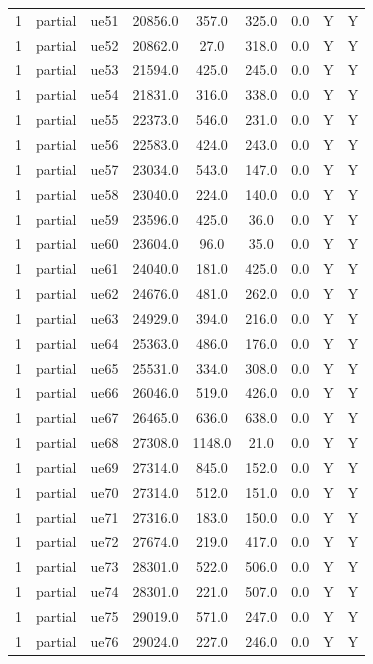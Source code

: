 \begin{table}[ht]
\begin{tabular}{|c|c|c|c|c|c|c|c|c|}
1 & partial & ue51 & 20856.0 & 357.0 & 325.0 & 0.0 & Y & Y \\
1 & partial & ue52 & 20862.0 & 27.0 & 318.0 & 0.0 & Y & Y \\
1 & partial & ue53 & 21594.0 & 425.0 & 245.0 & 0.0 & Y & Y \\
1 & partial & ue54 & 21831.0 & 316.0 & 338.0 & 0.0 & Y & Y \\
1 & partial & ue55 & 22373.0 & 546.0 & 231.0 & 0.0 & Y & Y \\
1 & partial & ue56 & 22583.0 & 424.0 & 243.0 & 0.0 & Y & Y \\
1 & partial & ue57 & 23034.0 & 543.0 & 147.0 & 0.0 & Y & Y \\
1 & partial & ue58 & 23040.0 & 224.0 & 140.0 & 0.0 & Y & Y \\
1 & partial & ue59 & 23596.0 & 425.0 & 36.0 & 0.0 & Y & Y \\
1 & partial & ue60 & 23604.0 & 96.0 & 35.0 & 0.0 & Y & Y \\
1 & partial & ue61 & 24040.0 & 181.0 & 425.0 & 0.0 & Y & Y \\
1 & partial & ue62 & 24676.0 & 481.0 & 262.0 & 0.0 & Y & Y \\
1 & partial & ue63 & 24929.0 & 394.0 & 216.0 & 0.0 & Y & Y \\
1 & partial & ue64 & 25363.0 & 486.0 & 176.0 & 0.0 & Y & Y \\
1 & partial & ue65 & 25531.0 & 334.0 & 308.0 & 0.0 & Y & Y \\
1 & partial & ue66 & 26046.0 & 519.0 & 426.0 & 0.0 & Y & Y \\
1 & partial & ue67 & 26465.0 & 636.0 & 638.0 & 0.0 & Y & Y \\
1 & partial & ue68 & 27308.0 & 1148.0 & 21.0 & 0.0 & Y & Y \\
1 & partial & ue69 & 27314.0 & 845.0 & 152.0 & 0.0 & Y & Y \\
1 & partial & ue70 & 27314.0 & 512.0 & 151.0 & 0.0 & Y & Y \\
1 & partial & ue71 & 27316.0 & 183.0 & 150.0 & 0.0 & Y & Y \\
1 & partial & ue72 & 27674.0 & 219.0 & 417.0 & 0.0 & Y & Y \\
1 & partial & ue73 & 28301.0 & 522.0 & 506.0 & 0.0 & Y & Y \\
1 & partial & ue74 & 28301.0 & 221.0 & 507.0 & 0.0 & Y & Y \\
1 & partial & ue75 & 29019.0 & 571.0 & 247.0 & 0.0 & Y & Y \\
1 & partial & ue76 & 29024.0 & 227.0 & 246.0 & 0.0 & Y & Y \\

\end{tabular}
\end{table}
